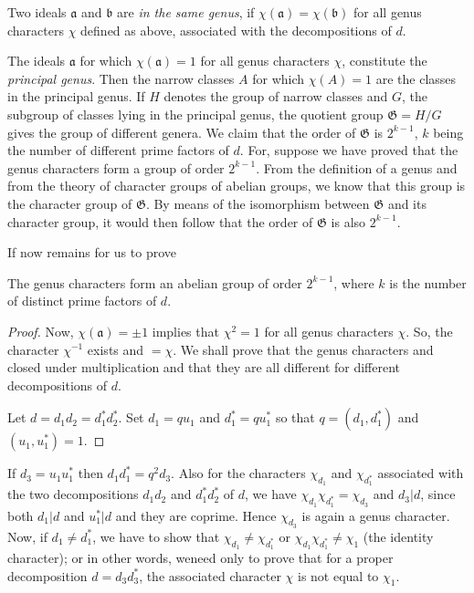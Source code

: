 Two ideals $\mathfrak{a}$ and $\mathfrak{b}$ are {\em in the same
  genus}, if $\chi(\mathfrak{a})=\chi(\mathfrak{b})$ for all genus
characters $\chi$ defined as above, associated with the decompositions
of $d$.

The ideals $\mathfrak{a}$ for which $\chi(\mathfrak{a})=1$ for all
genus characters $\chi$, constitute the {\em principal genus}. Then
the narrow classes $A$ for which $\chi(A)=1$ are the classes in the
principal genus. If $H$ denotes the group of narrow classes and $G$,
the subgroup of classes lying in the principal genus, the quotient
group $\mathfrak{G}=H/G$ gives the group of different genera. We claim
that the order of $\mathfrak{G}$ is $2^{k-1}$, $k$ being the number of
different prime factors of $d$. For, suppose we have proved that the
genus characters form a group of order $2^{k-1}$. From the definition
of a genus and from the theory of character groups of abelian groups,
we know that this group is the character group of $\mathfrak{G}$. By
means of the isomorphism between $\mathfrak{G}$ and its character
group, it would then follow that the order of $\mathfrak{G}$ is also
$2^{k-1}$.

If now remains for us to prove

\begin{proposition}\label{prop11}
The genus characters form an abelian group of order $2^{k-1}$, where
$k$ is the number of distinct prime factors of $d$.
\end{proposition}

\begin{proof}
Now, $\chi(\mathfrak{a})=\pm 1$ implies that $\chi^{2}=1$ for all
genus characters $\chi$. So, the character $\chi^{-1}$ exists and
$=\chi$. We shall prove that the genus characters and closed under
multiplication and that they are all different for different
decompositions of $d$.

Let $d=d_{1}d_{2}=d^{\ast}_{1}d^{\ast}_{2}$. Set $d_{1}=qu_{1}$ and
$d^{\ast}_{1}=qu^{\ast}_{1}$ so that $q=(d_{1},d^{\ast}_{1})$ and
$(u_{1},u^{\ast}_{1})=1$.
\end{proof}

If $d_{3}=u_{1}u^{\ast}_{1}$ then $d_{1}d^{\ast}_{1}=q^{2}d_{3}$. Also
for the characters $\chi_{d_{1}}$ and $\chi_{d^{\ast}_{1}}$ associated
with the two decompositions $d_{1}d_{2}$ and
$d^{\ast}_{1}d^{\ast}_{2}$ of $d$, we have
$\chi_{d_{1}}\chi_{d^{\ast}_{1}}=\chi_{d_{3}}$ and $d_{3}|d$, since
both $d_{1}|d$ and $u^{\ast}_{1}|d$ and they are coprime. Hence
$\chi_{d_{3}}$ is again a genus character. Now, if $d_{1}\neq
d^{\ast}_{1}$, we have to show that $\chi_{d_{1}}\neq
\chi_{d^{\ast}_{1}}$ or $\chi_{d_{1}}\chi_{d^{\ast}_{1}}\neq \chi_{1}$
(the identity character); or in other words, we\pageoriginale need
only to prove that for a proper decomposition $d=d_{3}d^{\ast}_{3}$,
the associated character $\chi$ is not equal to $\chi_{1}$.

